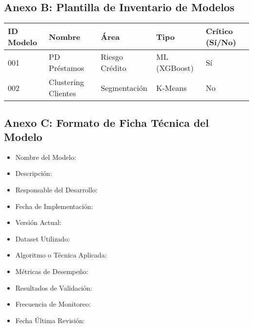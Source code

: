\documentclass[12pt]{article}
\begin{document}
\subsection*{Anexo B: Plantilla de Inventario de Modelos}
\begin{tabular}{|l|l|l|l|l|}
\hline
\textbf{ID Modelo} & \textbf{Nombre} & \textbf{Área} & \textbf{Tipo} & \textbf{Crítico (Sí/No)} \\
\hline
001 & PD Préstamos & Riesgo Crédito & ML (XGBoost) & Sí \\
\hline
002 & Clustering Clientes & Segmentación & K-Means & No \\
\hline
\end{tabular}

\subsection*{Anexo C: Formato de Ficha Técnica del Modelo}
\begin{itemize}
  \item Nombre del Modelo: 
  \item Descripción: 
  \item Responsable del Desarrollo: 
  \item Fecha de Implementación: 
  \item Versión Actual: 
  \item Dataset Utilizado: 
  \item Algoritmo o Técnica Aplicada: 
  \item Métricas de Desempeño: 
  \item Resultados de Validación: 
  \item Frecuencia de Monitoreo: 
  \item Fecha Última Revisión: 
\end{itemize}
\end{document}
